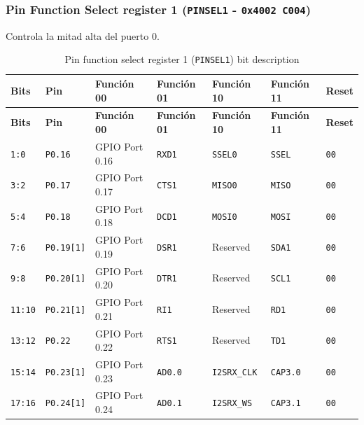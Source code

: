 \subsubsection{Pin Function Select register 1 (\texttt{PINSEL1} - \texttt{0x4002 C004})}
Controla la mitad alta del puerto 0.

\begin{longtable}{|>{\raggedright\arraybackslash}p{}|>{\raggedright\arraybackslash}p{}|>{\raggedright\arraybackslash}p{}|>{\raggedright\arraybackslash}p{}|>{\raggedright\arraybackslash}p{}|>{\raggedright\arraybackslash}p{}|>{\centering\arraybackslash}p{}|}
\caption{Pin function select register 1 (\texttt{PINSEL1}) bit description}\\
\hline
\textbf{Bits} & \textbf{Pin} & \textbf{Función 00} & \textbf{Función 01} & \textbf{Función 10} & \textbf{Función 11} & \textbf{Reset} \\
\hline
\endfirsthead
\hline
\textbf{Bits} & \textbf{Pin} & \textbf{Función 00} & \textbf{Función 01} & \textbf{Función 10} & \textbf{Función 11} & \textbf{Reset} \\
\hline
\endhead
\texttt{1:0} & \texttt{P0.16} & GPIO Port 0.16 & \texttt{RXD1} & \texttt{SSEL0} & \texttt{SSEL} & \texttt{00} \\
\hline
\texttt{3:2} & \texttt{P0.17} & GPIO Port 0.17 & \texttt{CTS1} & \texttt{MISO0} & \texttt{MISO} & \texttt{00} \\
\hline
\texttt{5:4} & \texttt{P0.18} & GPIO Port 0.18 & \texttt{DCD1} & \texttt{MOSI0} & \texttt{MOSI} & \texttt{00} \\
\hline
\texttt{7:6} & \texttt{P0.19[1]} & GPIO Port 0.19 & \texttt{DSR1} & Reserved & \texttt{SDA1} & \texttt{00} \\
\hline
\texttt{9:8} & \texttt{P0.20[1]} & GPIO Port 0.20 & \texttt{DTR1} & Reserved & \texttt{SCL1} & \texttt{00} \\
\hline
\texttt{11:10} & \texttt{P0.21[1]} & GPIO Port 0.21 & \texttt{RI1} & Reserved & \texttt{RD1} & \texttt{00} \\
\hline
\texttt{13:12} & \texttt{P0.22} & GPIO Port 0.22 & \texttt{RTS1} & Reserved & \texttt{TD1} & \texttt{00} \\
\hline
\texttt{15:14} & \texttt{P0.23[1]} & GPIO Port 0.23 & \texttt{AD0.0} & \texttt{I2SRX\_CLK} & \texttt{CAP3.0} & \texttt{00} \\
\hline
\texttt{17:16} & \texttt{P0.24[1]} & GPIO Port 0.24 & \texttt{AD0.1} & \texttt{I2SRX\_WS} & \texttt{CAP3.1} & \texttt{00} \\

\end{longtable}
